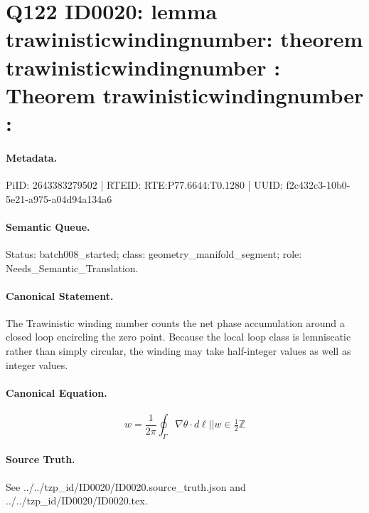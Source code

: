 \section*{Q122 ID0020: lemma trawinisticwindingnumber: theorem trawinisticwindingnumber : Theorem trawinisticwindingnumber :}
\paragraph{Metadata.}
PiID: 2643383279502 | RTEID: RTE:P77.6644:T0.1280 | UUID: f2c432c3-10b0-5e21-a975-a04d94a134a6

\paragraph{Semantic Queue.}
Status: batch008\_started; class: geometry\_manifold\_segment; role: Needs\_Semantic\_Translation.

\paragraph{Canonical Statement.}
The Trawinistic winding number counts the net phase accumulation around a closed loop encircling the zero point. Because the local loop class is lemniscatic rather than simply circular, the winding may take half-integer values as well as integer values.

\paragraph{Canonical Equation.}
\[
w = \frac{1}{2\pi} \oint_{\Gamma} \nabla \theta \cdot d\ell || w \in \tfrac{1}{2}\mathbb{Z}
\]

\paragraph{Source Truth.}
See ../../tzp\_id/ID0020/ID0020.source\_truth.json and ../../tzp\_id/ID0020/ID0020.tex.
